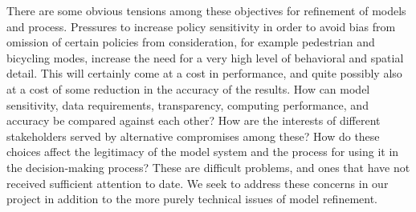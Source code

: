 There are some obvious tensions among these objectives for refinement of
models and process.  Pressures to increase policy sensitivity in order to
avoid bias from omission of certain policies from consideration, for example
pedestrian and bicycling modes, increase the need for
a very high level of behavioral and spatial detail.  This
will certainly come at a cost in performance, and
quite possibly also at a cost of some reduction in the accuracy of the
results.  How can model sensitivity, data requirements, transparency,
computing performance, and accuracy be compared against each other?  How are
the interests of different stakeholders served by alternative compromises
among these?  How do these choices affect the legitimacy of the model
system and the process for using it in the decision-making process?  These
are difficult problems, and ones that have not received sufficient
attention to date.  We seek to address these concerns in our project in
addition to the more purely technical issues of model refinement.

